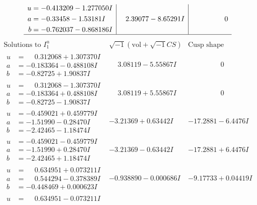 \documentclass[1p]{elsarticle_modified}
\theoremstyle{definition}
\newcommand{\I}{\sqrt{-1}}
\begin{document}
$$\begin{array}{c|c|c}
\begin{aligned}
u &= -0.413209 - 1.277050 I \\
a &= -0.33458 - 1.53181 I \\
b &= -0.762037 - 0.868186 I\end{aligned}
 & \phantom{-}2.39077 - 8.65291 I & \phantom{-0.000000 } 0\\
 \hline 
 \end{array}$$\newpage$$\begin{array}{c|c|c}  
\text{Solutions to }I^u_{1}& \I (\text{vol} + \sqrt{-1}CS) & \text{Cusp shape}\\
 \hline 
\begin{aligned}
u &= \phantom{-}0.312068 + 1.307370 I \\
a &= -0.183364 - 0.488108 I \\
b &= -0.82725 + 1.90837 I\end{aligned}
 & \phantom{-}3.08119 - 5.55867 I & \phantom{-0.000000 } 0 \\ \hline\begin{aligned}
u &= \phantom{-}0.312068 - 1.307370 I \\
a &= -0.183364 + 0.488108 I \\
b &= -0.82725 - 1.90837 I\end{aligned}
 & \phantom{-}3.08119 + 5.55867 I & \phantom{-0.000000 } 0 \\ \hline\begin{aligned}
u &= -0.459021 + 0.459779 I \\
a &= -1.51990 - 0.28470 I \\
b &= -2.42465 - 1.18474 I\end{aligned}
 & -3.21369 + 0.63442 I & -17.2881 - 6.4476 I \\ \hline\begin{aligned}
u &= -0.459021 - 0.459779 I \\
a &= -1.51990 + 0.28470 I \\
b &= -2.42465 + 1.18474 I\end{aligned}
 & -3.21369 - 0.63442 I & -17.2881 + 6.4476 I \\ \hline\begin{aligned}
u &= \phantom{-}0.634951 + 0.073211 I \\
a &= \phantom{-}0.544294 - 0.378389 I \\
b &= -0.448469 + 0.000623 I\end{aligned}
 & -0.938890 - 0.000686 I & -9.17733 + 0.04419 I \\ \hline\begin{aligned}
u &= \phantom{-}0.634951 - 0.073211 I \\

\end{aligned}
\end{array}$$
\end{document}
